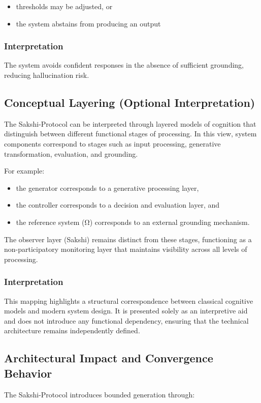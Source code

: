 \documentclass[12pt,a4paper]{article}
\begin{document}
\begin{itemize}
\item thresholds may be adjusted, or
\item the system abstains from producing an output
\end{itemize}
\subsubsection *{Interpretation}
The system avoids confident responses in the absence of sufficient grounding, reducing hallucination risk.

\subsection{Conceptual Layering (Optional Interpretation)}
The Sakshi-Protocol can be interpreted through layered models of cognition that distinguish between different functional stages of processing. In this view, system components correspond to stages such as input processing, generative transformation, evaluation, and grounding.

For example:
\begin{itemize}
\item the generator corresponds to a generative processing layer,
\item the controller corresponds to a decision and evaluation layer, and
\item the reference system (Ω) corresponds to an external grounding mechanism.
\end{itemize}
The observer layer (Sakshi) remains distinct from these stages, functioning as a non-participatory monitoring layer that maintains visibility across all levels of processing.

\subsubsection*{Interpretation}
This mapping highlights a structural correspondence between classical cognitive models and modern system design. It is presented solely as an interpretive aid and does not introduce any functional dependency, ensuring that the technical architecture remains independently defined.

\subsection{Architectural Impact and Convergence Behavior}
The Sakshi-Protocol introduces bounded generation through:
\end{document}
